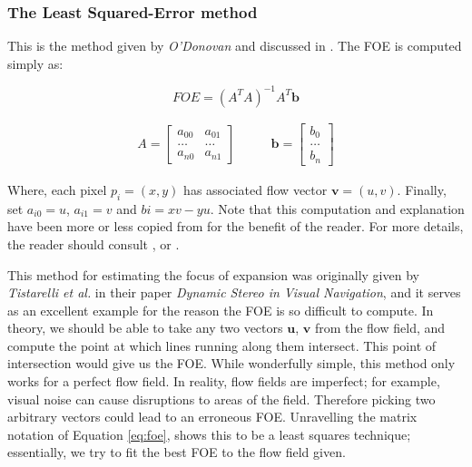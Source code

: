 \documentclass[a4paper,11pt,twoside,openright]{article}
\begin{document}
\subsubsection{The Least Squared-Error method}
This is the method given by \textit{O'Donovan} and discussed in
\cite{Mitchell2018}. The FOE is computed simply as:

\begin{equation}
  \label{eq:foe}
  FOE = (A^TA)^{-1}A^T\mathbf{b}
\end{equation}

\begin{equation*}
  \begin{split}
 A =
\begin{bmatrix}
  a_{00} & a_{01}\\
  \dots  & \dots \\
  a_{n0} &  a_{n1}
\end{bmatrix}
\qquad
\end{split}
\begin{split}
\mathbf{b} =
\begin{bmatrix}
  b_0 \\
  \dots \\
  b_n
\end{bmatrix}
\end{split}
\end{equation*}
\newline

Where, each pixel $p_i = (x, y)$ has associated flow vector $\mathbf{v} = (u,v)$.
Finally, set $a_{i0} = u$, $a_{i1} = v$ and $b{i} = xv - yu$. Note that this
computation and explanation have been more or less copied from
\cite{Mitchell2018} for the benefit of the reader. For more details, the reader
should consult \cite{Mitchell2018}, or \cite{ODonovan2005}.
\newline
\par

This method for estimating the focus of expansion was originally given by
\textit{Tistarelli et al.} in their paper
\textit{Dynamic Stereo in Visual Navigation}\cite{Tistarelli1991, ODonovan2005},
and it serves as an excellent example for the reason the FOE is so difficult to
compute. In theory, we should be able to take any two vectors $\mathbf{u}$,
$\mathbf{v}$ from the flow field, and compute the point at which lines
running along them intersect. This point of intersection would give us the
FOE\cite{ODonovan2005}. While wonderfully simple, this method only works for
a perfect flow field. In reality, flow fields are imperfect; for example,
visual noise can cause disruptions to areas of the field. Therefore picking two
arbitrary vectors could lead to an erroneous FOE. Unravelling the matrix notation
of Equation \ref{eq:foe}, shows this to be a least squares technique;
essentially, we try to fit the best FOE to the flow field given.
\end{document}
